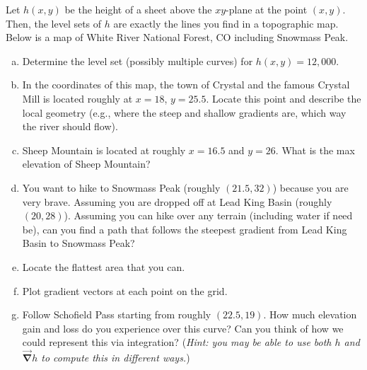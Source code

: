 \documentclass[12pt]{amsbook}
\newcommand{\grad}{\boldsymbol{\vec{\nabla}}}
\begin{document}
\begin{problem}
	Let $h(x,y)$ be the height of a sheet above the $xy$-plane at the point $(x,y)$. Then, the level sets of $h$ are exactly the lines you find in a topographic map. Below is a map of White River National Forest, CO including Snowmass Peak. 
	\begin{enumerate}[(a)]
		\item Determine the level set (possibly multiple curves) for $h(x,y)=12,000$.
		\item In the coordinates of this map, the town of Crystal and the famous Crystal Mill is located roughly at $x=18$, $y=25.5$. Locate this point and describe the local geometry (e.g., where the steep and shallow gradients are, which way the river should flow).
		\item Sheep Mountain is located at roughly $x=16.5$ and $y=26$. What is the max elevation of Sheep Mountain?
		\item You want to hike to Snowmass Peak (roughly $(21.5,32)$) because you are very brave. Assuming you are dropped off at Lead King Basin (roughly $(20,28)$). Assuming you can hike over any terrain (including water if need be), can you find a path that follows the steepest gradient from Lead King Basin to Snowmass Peak?
		\item Locate the flattest area that you can.
		\item Plot gradient vectors at each point on the grid.
		\item Follow Schofield Pass starting from roughly $(22.5,19)$. How much elevation gain and loss do you experience over this curve? Can you think of how we could represent this via integration? (\emph{Hint: you may be able to use both $h$ and $\grad h$ to compute this in different ways.})
	\end{enumerate}
\newpage
	\begin{figure}[H]
		\centering

\end{figure}
\end{problem}
\end{document}

